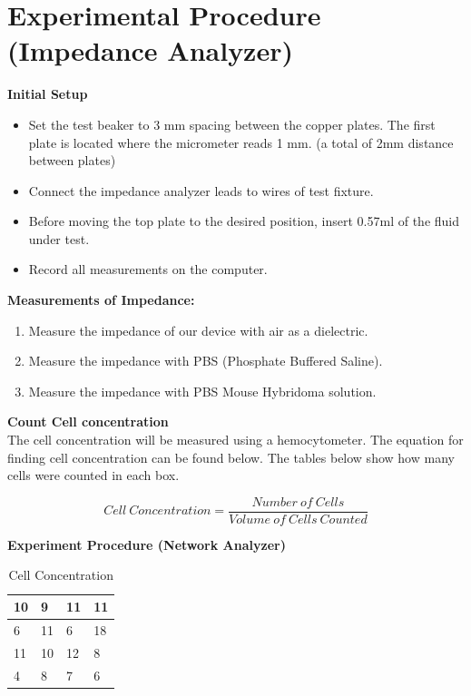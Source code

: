 \documentclass[journal]{IEEEtran}
\begin{document}
\section{Experimental Procedure (Impedance Analyzer)}

\textbf{Initial Setup}
\begin{itemize}
	\item Set the test beaker to 3 mm spacing between the copper plates. The first plate is located where the micrometer reads 1 mm. (a total of 2mm distance between plates)
	\item Connect the impedance analyzer leads to wires of test fixture.
	\item Before moving the top plate to the desired position, insert 0.57ml of the fluid under test.
	\item Record all measurements on the computer.
\end{itemize}

\textbf{Measurements of Impedance:}
\begin{enumerate}
	\item Measure the impedance of our device with air as a dielectric.
	\item Measure the impedance with PBS (Phosphate Buffered Saline).
	\item Measure the impedance with PBS Mouse Hybridoma solution.
\end{enumerate}

\textbf{Count Cell concentration} \\
The cell concentration will be measured using a hemocytometer. The equation for finding cell concentration can be found below. The tables below show how many cells were counted in each box.

\begin{equation}
\label{cell-concentration}
Cell \: Concentration = \frac{Number \: of \: Cells}{Volume \: of \: Cells \: Counted}
\end{equation}

\textbf{Experiment Procedure (Network Analyzer)} \\
\begin{table}[ht]
\centering
\caption{Cell Concentration}
\label{table-1}
\begin{tabular}{|l|l|l|l|}
\hline
10 & 9  & 11 & 11 \\ \hline
6  & 11 & 6  & 18 \\ \hline
11 & 10 & 12 & 8  \\ \hline
4  & 8  & 7  & 6  \\ \hline
\end{tabular}
\end{table}
\end{document}
